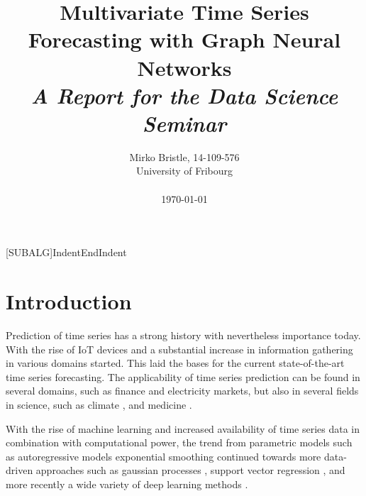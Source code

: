 \documentclass[letterpaper, twocolumn,11pt]{article}
\begin{document}
    [SUBALG]{Indent}{EndIndent}{}{\algorithmicend\ }%

    \title{\Large \bf Multivariate Time Series Forecasting with Graph Neural Networks \\
    \Medium \it A Report for the Data Science Seminar
    }

    \author{
            {\rm Mirko Bristle, 14-109-576}\\
        University of Fribourg \\
        \\
        \today
    }
    \maketitle


%


    \section{Introduction}

    Prediction of time series has a strong history with nevertheless importance today. With the rise of IoT devices and a substantial
    increase in information gathering in various domains started. This laid the bases for the current state-of-the-art time series forecasting.
    The applicability of time series prediction can be found in several domains, such as finance and electricity markets, but also in several fields in science, such as climate \cite{mudelsee2019trend}, and medicine \cite{topol2019high}.

	With the rise of machine learning and increased availability of time series data in combination with computational power, the trend from parametric models such as autoregressive models \cite{box2015time} exponential smoothing \cite{gardner1985exponential} continued towards more data-driven approaches such as gaussian processes \cite{williams1995gaussian}, support vector regression \cite{smola2004tutorial}, and more recently a wide variety of deep learning methods \cite{lim2021time, torres2021deep}.
\end{document}
